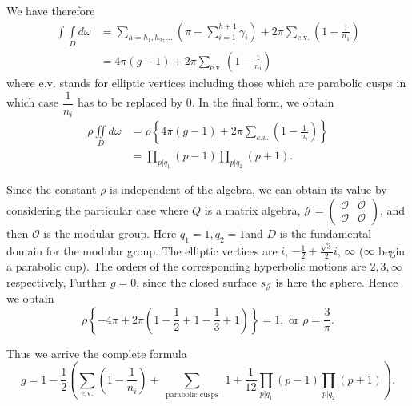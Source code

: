 We have therefore 
\begin{align*}
  \int \int\limits_D  d \omega & = \sum_{ h = h _1, h_2,\ldots} \left(\pi -
  \sum_{i = 1 }^{ h + 1} \gamma_i\right) + 2 \pi \sum_{\text{e.v.}} \left(1 -
  \frac{1}{n_1}\right) \\ 
  & = 4 \pi (g - 1) + 2 \pi \sum_{\text{e.v.}} \left(1 - \frac{1}{n_i}\right) 
\end{align*}
where e.v. stands for elliptic vertices including those which are
parabolic cusps in which case $\dfrac{1}{n_i}$ has to be replaced by
$0$. In the final form,  we obtain  
\begin{align*}
  \rho \iint \limits_D d \omega & = \rho \left\{ 4 \pi (g - 1) + 2 \pi
  \sum_{ e.  v.} \left(1- \frac{1}{n _i}\right)\right\} \\
  & = \prod_{ p | q_1} ( p - 1) \prod_{ p | q_2} (p + 1). 
\end{align*}

Since the constant $\rho$ is independent of the algebra, we can obtain
its value by considering the particular case where
$Q$ is a matrix algebra, $\mathcal{J} =  \begin{pmatrix}\mathscr{O} &
  \mathscr{O} \\ \mathscr{O} & \mathscr{O}\end{pmatrix}$, and then
$\mathscr{O}$ is the modular group. Here $q_1 = 1, q_2 = 1$and $D$ is
the fundamental domain for the modular group. The elliptic vertices
are $i$, $-\frac{1}{2} + \frac{\sqrt{3}}{2} i$, $\infty $  ($\infty $
begin a parabolic cup). The orders of the corresponding hyperbolic
motions are $2, 3, \infty $ respectively,  Further $ g = 0$,  since the
closed surface $s_{\mathcal{J}}$ is here the sphere. Hence we obtain  
$$
\rho \left\{ - 4 \pi + 2 \pi \left( 1- \frac{1}{2} + 1 - \frac{1}{3} + 1\right)
\right\} = 1, \text{ or } \rho = \frac{3}{\pi}. 
$$

Thus we arrive the complete formula 
$$
g = 1 - \frac{1}{2} \left( \sum_{\text{e.v.}} \left( 1 -
\frac{1}{n_i}\right)+ \sum_{ 
  \text{ parabolic cusps }}~  1 + \frac{1}{12}  \prod_{ p | q_1} ( p -
1)\prod_{ p | q_2} ( p+1)\right). 
$$
